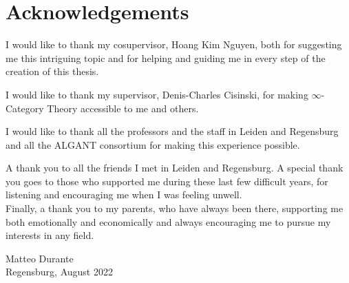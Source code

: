 \chapter*{Acknowledgements}

I would like to thank my cosupervisor, Hoang Kim Nguyen, both for suggesting me
this intriguing topic and for helping and guiding me in every step of the
creation of this thesis.

\noindent I would like to thank my supervisor, Denis-Charles Cisinski, for
making $\infty$-Category Theory accessible to me and others.

\noindent I would like to thank all the professors and the staff in Leiden and
Regensburg and all the ALGANT consortium for making this experience
possible.

\noindent A thank you to all the friends I met in Leiden and Regensburg. A
special thank you goes to those who supported me during these last few difficult
years, for listening and encouraging me when I was feeling unwell.\\

\noindent Finally, a thank you to my parents, who have always been there,
supporting me both emotionally and economically and always encouraging me to
pursue my interests in any field.

\begin{flushright}
	Matteo Durante \\ Regensburg, August 2022
\end{flushright}
